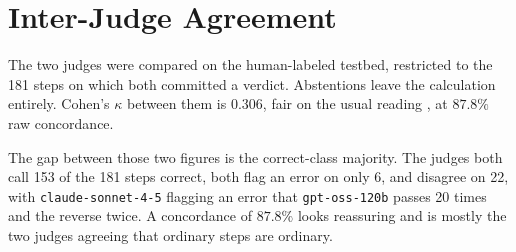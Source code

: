 %
%
\section{Inter-Judge Agreement}
\label{app:agreement}

The two judges were compared on the human-labeled testbed, restricted to the
181 steps on which both committed a verdict. Abstentions leave the calculation
entirely. Cohen's $\kappa$ between them is $0.306$, fair on the usual reading
\citep{artstein2008agreement}, at $87.8\%$ raw concordance.

The gap between those two figures is the correct-class majority. The judges
both call 153 of the 181 steps correct, both flag an error on only 6, and
disagree on 22, with \texttt{claude-sonnet-4-5} flagging an error that
\texttt{gpt-oss-120b} passes 20 times and the reverse twice. A concordance of
$87.8\%$ looks reassuring and is mostly the two judges agreeing that ordinary
steps are ordinary.

